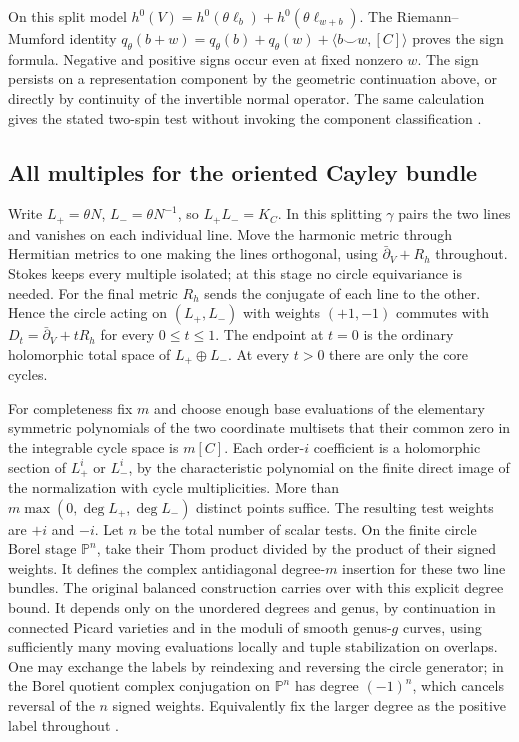 On this split model \(h^0(V)=h^0(\theta\ell_b)+h^0(\theta\ell_{w+b})\). The Riemann--Mumford identity \(q_\theta(b+w)=q_\theta(b)+q_\theta(w)+\langle b\smile w,[C]\rangle\) proves the sign formula. Negative and positive signs occur even at fixed nonzero \(w\). The sign persists on a representation component by the geometric continuation above, or directly by continuity of the invertible normal operator. The same calculation gives the stated two-spin test without invoking the component classification \cite{mumford}.

\subsection{All multiples for the oriented Cayley bundle}

Write \(L_+=\theta N\), \(L_-=\theta N^{-1}\), so \(L_+L_-=K_C\). In this splitting \(\gamma\) pairs the two lines and vanishes on each individual line. Move the harmonic metric through Hermitian metrics to one making the lines orthogonal, using \(\bar\partial_V+R_h\) throughout. Stokes keeps every multiple isolated; at this stage no circle equivariance is needed. For the final metric \(R_h\) sends the conjugate of each line to the other. Hence the circle acting on \((L_+,L_-)\) with weights \((+1,-1)\) commutes with \(D_t=\bar\partial_V+tR_h\) for every \(0\le t\le1\). The endpoint at \(t=0\) is the ordinary holomorphic total space of \(L_+\oplus L_-\). At every \(t>0\) there are only the core cycles.

For completeness fix \(m\) and choose enough base evaluations of the elementary symmetric polynomials of the two coordinate multisets that their common zero in the integrable cycle space is \(m[C]\). Each order-\(i\) coefficient is a holomorphic section of \(L_+^i\) or \(L_-^i\), by the characteristic polynomial on the finite direct image of the normalization with cycle multiplicities. More than \(m\max(0,\deg L_+,\deg L_-)\) distinct points suffice. The resulting test weights are \(+i\) and \(-i\). Let \(n\) be the total number of scalar tests. On the finite circle Borel stage \(\mathbb P^n\), take their Thom product divided by the product of their signed weights. It defines the complex antidiagonal degree-\(m\) insertion for these two line bundles. The original balanced construction carries over with this explicit degree bound. It depends only on the unordered degrees and genus, by continuation in connected Picard varieties and in the moduli of smooth genus-\(g\) curves, using sufficiently many moving evaluations locally and tuple stabilization on overlaps. One may exchange the labels by reindexing and reversing the circle generator; in the Borel quotient complex conjugation on \(\mathbb P^n\) has degree \((-1)^n\), which cancels reversal of the \(n\) signed weights. Equivalently fix the larger degree as the positive label throughout \cite{WueBalanced}.

